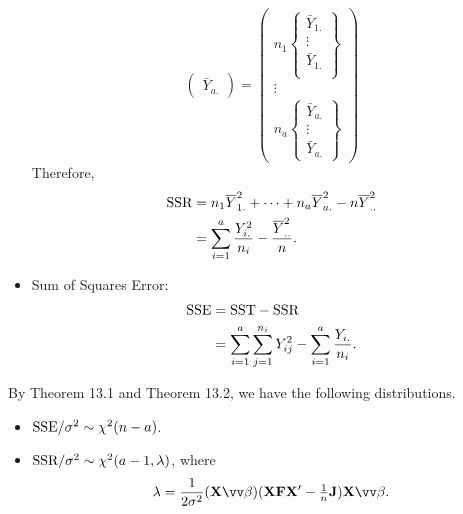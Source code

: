 \begin{itemize}
\[\begin{pmatrix}
                  \bar{Y}_{a.}
              \end{pmatrix}=\begin{pmatrix}
                  n_1\begin{Bmatrix}
                         \bar{Y}_{1.} \\
                         \vdots       \\
                         \bar{Y}_{1.} \\
                     \end{Bmatrix} \\
                  \vdots            \\
                  n_a\begin{Bmatrix}
                         \bar{Y}_{a.} \\
                         \vdots       \\
                         \bar{Y}_{a.}
                     \end{Bmatrix}
              \end{pmatrix} \]
          Therefore,
          \begin{align*}
              \text{SSR}
               & =n_1\overline{Y}_{1.}^2+\cdots+n_a\overline{Y}_{a.}^2-n\overline{Y}_{..}^2   \\
               & =\sum_{i=1}^{a}\frac{Y_{i.}^2}{n_i}-\frac{\overline{Y}_{..}^2}{n}.
          \end{align*}
    \item Sum of Squares Error:
          \begin{align*}
              \text{SSE}
               & =\text{SST}-\text{SSR}                                                                \\
               & =\sum_{i=1}^{a}\sum_{j=1}^{n_i}Y_{ij}^2-\sum_{i=1}^{a}\frac{Y_{i.}}{n_i}.
          \end{align*}
\end{itemize}
By Theorem 13.1 and Theorem 13.2, we have the following distributions.
\begin{itemize}
    \item $ \text{SSE}/\sigma^2 \sim \chi^2(n-a) $.
    \item $ \text{SSR}/\sigma^2 \sim \chi^2(a-1,\lambda) $, where
          \[ \lambda=\frac{1}{2\sigma^2}(\Matrix{X}\Vector{\beta})(\Matrix{X}\Matrix{F}\Matrix{X}'-\tfrac{1}{n}\Matrix{J})\Matrix{X}\Vector{\beta}. \]
\end{itemize}